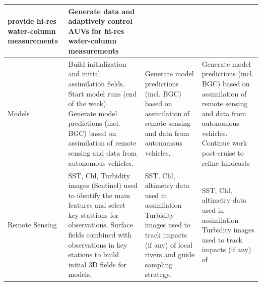 \begin{table}[!t]
{\begin{tabular}{|p{4cm}|p{4cm}|p{4cm}|p{4cm}|}
                                                     provide hi-res
                                                              water-column
                                                     measurements&Generate
                                                                   data
                                                                   and
                                                                   adaptively
                                                                   control
                                                                   AUVs
                                                                   for
                                                                   hi-res
                                                                   water-column measurements\\
    \hline
    Models&Build initialization and initial assimilation fields. 
            Start model runs (end of the week). Generate model
            predictions (incl. BGC) based on assimilation of remote sensing and data
                                  from autonomous vehicles.&Generate model
            predictions (incl. BGC) based on assimilation of remote sensing and data
                                  from autonomous vehicles.&Generate model
            predictions (incl. BGC) based on assimilation of remote sensing and data
                                  from autonomous vehicles. Continue
                                                             work
                                                             post-cruise
    to refine hindcasts\\
    \hline
     Remote Sensing&SST, Chl, Turbidity images (Sentinel) used to
                    identify the main features and select key stattions for
                    observations. Surface fields combined with observations in key
                    stations to build initial 3D fields for models.&SST, Chl, altimetry data used in assimilation
                             Turbidity images used to track impacts (if
                             any) of local rivers and guide sampling
                                                                     strategy.
                                                     &SST, Chl,
                                                       altimetry data
                                                       used in
                                                       assimilation 
                                            Turbidity images used to
                                            track impacts (if any) of

\end{tabular}}
\end{table}
